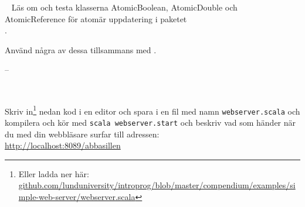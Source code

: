 
\QUESTBEGIN

\Task  \what~ Läs om och testa klasserna AtomicBoolean, AtomicDouble och AtomicReference för atomär uppdatering i paketet \\ .

Använd några av dessa tillsammans med .


\SOLUTION

\TaskSolved --

\QUESTEND






\QUESTBEGIN

\Task  \what~

\Subtask Skriv in\footnote{Eller ladda ner här: \href{https://github.com/lunduniversity/introprog/blob/master/compendium/examples/simple-web-server/webserver.scala}{github.com/lunduniversity/introprog/blob/master/compendium/examples/simple-web-server/webserver.scala}} nedan kod i en editor och spara i en fil med namn \texttt{webserver.scala} och kompilera och kör med \texttt{scala webserver.start} och beskriv vad som händer när du med din webbläsare surfar till adressen: \\ \url{http://localhost:8089/abbasillen}



